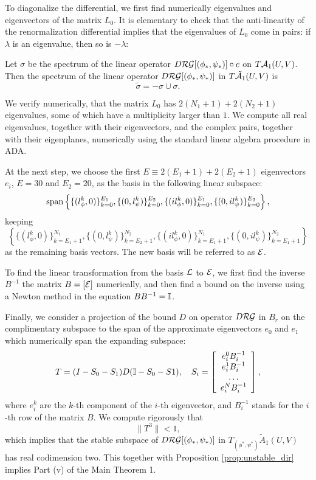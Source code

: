 To diagonalize the differential, we first find numerically eigenvalues and eigenvectors of the matrix $L_0$. It is elementary to check that the anti-linearity of the renormalization differential implies that the eigenvalues of $L_0$ come in pairs: if $\lambda$ is an eigenvalue, then so is $-\lambda$:
\begin{lemma} \label{lem:spectra}
Let $\sigma$  be the spectrum of the linear operator $D \mathcal{RG}[(\phi_*,\psi_*)] \circ c$ on $T \mathcal{A}_1(U,V)$. Then the spectrum of the linear operator $D \mathcal{RG}[(\phi_*,\psi_*)]$ in $T \tilde{\mathcal{A}}_1(U,V)$ is 
$$\tilde{\sigma}=-\sigma \cup \sigma.$$
\end{lemma} 
We verify numerically, that the matrix $L_0$ has $2(N_1+1)+2(N_2+1)$ eigenvalues, some of which have a multiplicity larger than $1$. We compute all real  eigenvalues, together with their eigenvectors, and the complex pairs, together with their eigenplanes, numerically using the standard linear algebra procedure in ADA. 


At the next step, we choose the first $E \equiv 2(E_1+1)+2(E_2+1)$ eigenvectors $e_i$, $E=30$ and $E_2=20$, as the basis in the following linear subspace:
$${\rm span} \left\{ \{ (l_\phi^k,0) \}_{k=0}^{E_1},\{(0,l_\psi^k)\}_{k=0}^{E_2},\{(i l_\phi^k,0)\}_{k=0}^{E_1},\{(0,i l_\psi^k)\}_{k=0}^{E_2} \right\},$$ 
keeping 
$$\left\{ \{ (l_\phi^k,0) \}_{k=E_1+1}^{N_1},\{(0,l_\psi^k)\}_{k=E_2+1}^{N_2},\{(i l_\phi^k,0)\}_{k=E_1+1}^{N_1},\{(0,i l_\psi^k)\}_{k=E_1+1}^{N_2} \right\}$$ 
as the remaining basis vectors. The new basis will be referred to as $\mathcal{E}$. 

To find the linear transformation from the basis $\mathcal{L}$ to $\mathcal{E}$, we first find the inverse $B^{-1}$ the matrix $B=\left[ \mathcal{E} \right]$ numerically, and then find a bound on the inverse using a Newton method in the equation $B B^{-1}=\mathbb{I}$. 

Finally, we consider a projection of the bound $D$ on operator $D \mathcal{RG}$ in  $B_r$ on the complimentary subspace to the span of the approximate eigenvectors $e_0$ and $e_1$ which numerically span the expanding subspace:
$$T=(I-S_0 -S_1) D (\mathbb{I} -S_0 -S1), \quad S_i=\left[
\begin{array}{c}
e_i^0  B^{-1}_i \cr
e_i^1  B^{-1}_i \cr
\ldots   \cr
e_i^N  B^{-1}_i \cr
\end{array}
\right], 
$$
where $e_i^k$ are the $k$-th component of the $i$-th eigenvector, and $B^{-1}_i$ stands for the $i$-th row of the matrix $B$. We compute rigorously that
$$\| T^3 \| <1,$$ 
which implies that the stable subspace of $D \mathcal{RG}[(\phi_*,\psi_*)]$ in $T_{(\phi^*,\psi^*)} \tilde{A}_1(U,V)$ has real codimension two.  This together with Proposition \ref{prop:unstable_dir} implies Part (v) of the Main Theorem 1.  


